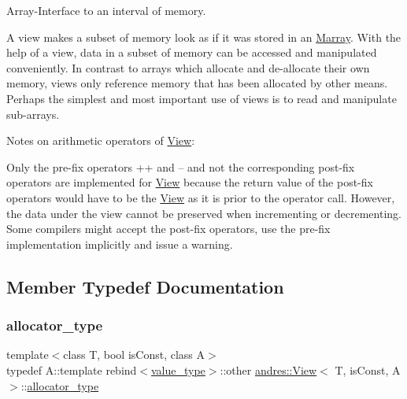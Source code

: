 Array-\/\+Interface to an interval of memory.

A view makes a subset of memory look as if it was stored in an \hyperlink{classandres_1_1Marray}{Marray}. With the help of a view, data in a subset of memory can be accessed and manipulated conveniently. In contrast to arrays which allocate and de-\/allocate their own memory, views only reference memory that has been allocated by other means. Perhaps the simplest and most important use of views is to read and manipulate sub-\/arrays.

Notes on arithmetic operators of \hyperlink{classandres_1_1View}{View}\+:
\begin{DoxyItemize}
\item Only the pre-\/fix operators ++ and -- and not the corresponding post-\/fix operators are implemented for \hyperlink{classandres_1_1View}{View} because the return value of the post-\/fix operators would have to be the \hyperlink{classandres_1_1View}{View} as it is prior to the operator call. However, the data under the view cannot be preserved when incrementing or decrementing. Some compilers might accept the post-\/fix operators, use the pre-\/fix implementation implicitly and issue a warning. 
\end{DoxyItemize}

\subsection{Member Typedef Documentation}
\mbox{\label{classandres_1_1View_a175e5862a7133a937e7901e5894c2e10}} 
\subsubsection{\texorpdfstring{allocator\+\_\+type}{allocator\_type}}
{\footnotesize\ttfamily template$<$class T, bool is\+Const, class A$>$ \\
typedef A\+::template rebind$<$\hyperlink{classandres_1_1View_abe3d48ac2b0d65536e54dbfad0a44929}{value\+\_\+type}$>$\+::other \hyperlink{classandres_1_1View}{andres\+::\+View}$<$ T, is\+Const, A $>$\+::\hyperlink{classandres_1_1View_a175e5862a7133a937e7901e5894c2e10}{allocator\+\_\+type}}

\mbox{\label{classandres_1_1View_ac9b2563b59f4fe1d90144bc4be2a2008}} 
